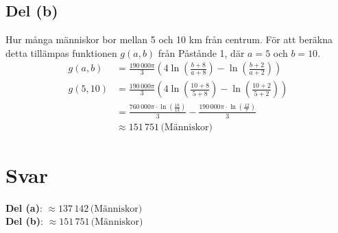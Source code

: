\documentclass{article}
\begin{document}
\subsection*{Del (b)}
Hur många människor bor mellan 5 och 10 km från centrum. För att beräkna detta
tillämpas funktionen \( g(a,b) \) från Påstånde 1, där \( a = 5 \) och \( b =
10 \).
\begin{align*}
	g(a,b) &= \frac{190\,000 \pi}{3}
		\left(4\ln{\left(\frac{b + 8}{a + 8}\right)} 
		- \ln{\left(\frac{b + 2}{a + 2}\right)} \right)
		\\ 
	g(5,10) &= \frac{190\,000\pi}{3} \left(4\ln{\left(\frac{10 + 8}{5 + 8}\right)} 
		- \ln{\left(\frac{10 + 2}{5 + 2}\right)}\right) \\
	       &= \frac{760\,000\pi \cdot \ln{\left(\frac{18}{13}\right)}}{3} 
	       - \frac{190\,000\pi \cdot \ln{\left(\frac{12}{7}\right)}}{3} \\
	       &\approx 151\,751 \, \text{(Människor)}
\end{align*}

\section*{Svar}
\textbf{Del (a)}: $\approx 137\,142 \, \text{(Människor)}$ \\
\textbf{Del (b)}: $\approx 151\,751 \, \text{(Människor)}$
\end{document}
